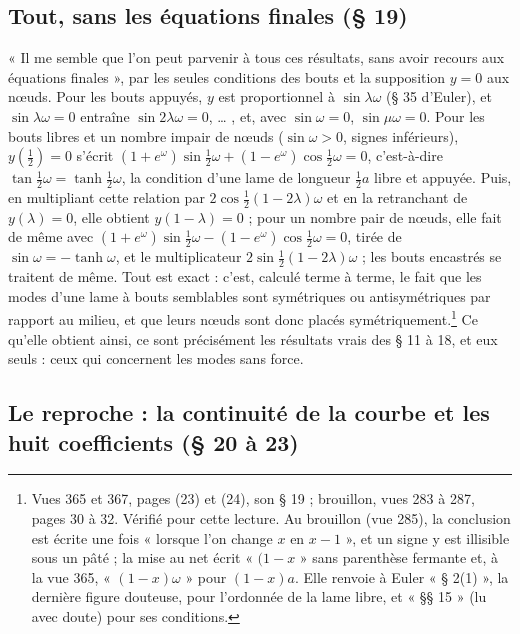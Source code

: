 \documentclass[11pt,a4paper]{article}
\begin{document}
\subsection*{Tout, sans les équations finales (§ 19)}

« Il me semble que l'on peut parvenir à tous ces résultats, sans avoir recours aux équations finales », par les seules conditions des bouts et la supposition $y=0$ aux nœuds. Pour les bouts appuyés, $y$ est proportionnel à $\sin\lambda\omega$ (§ 35 d'Euler), et $\sin\lambda\omega=0$ entraîne $\sin2\lambda\omega=0$, … , et, avec $\sin\omega=0$, $\sin\mu\omega=0$. Pour les bouts libres et un nombre impair de nœuds ($\sin\omega>0$, signes inférieurs), $y(\frac12)=0$ s'écrit $(1+e^{\omega})\sin\frac12\omega+(1-e^{\omega})\cos\frac12\omega=0$, c'est-à-dire $\tan\frac12\omega=\tanh\frac12\omega$, la condition d'une lame de longueur $\frac12a$ libre et appuyée. Puis, en multipliant cette relation par $2\cos\frac12(1-2\lambda)\omega$ et en la retranchant de $y(\lambda)=0$, elle obtient $y(1-\lambda)=0$ ; pour un nombre pair de nœuds, elle fait de même avec $(1+e^{\omega})\sin\frac12\omega-(1-e^{\omega})\cos\frac12\omega=0$, tirée de $\sin\omega=-\tanh\omega$, et le multiplicateur $2\sin\frac12(1-2\lambda)\omega$ ; les bouts encastrés se traitent de même. Tout est exact : c'est, calculé terme à terme, le fait que les modes d'une lame à bouts semblables sont symétriques ou antisymétriques par rapport au milieu, et que leurs nœuds sont donc placés symétriquement.\footnote{Vues 365 et 367, pages (23) et (24), son § 19 ; brouillon, vues 283 à 287, pages 30 à 32. Vérifié pour cette lecture. Au brouillon (vue 285), la conclusion est écrite une fois « lorsque l'on change $x$ en $x-1$ », et un signe y est illisible sous un pâté ; la mise au net écrit « $(1-x$ » sans parenthèse fermante et, à la vue 365, « $(1-x)\omega$ » pour $(1-x)a$. Elle renvoie à Euler « § 2(1) », la dernière figure douteuse, pour l'ordonnée de la lame libre, et « §§ 15 » (lu avec doute) pour ses conditions.} Ce qu'elle obtient ainsi, ce sont précisément les résultats vrais des § 11 à 18, et eux seuls : ceux qui concernent les modes sans force.

\subsection*{Le reproche : la continuité de la courbe et les huit coefficients (§ 20 à 23)}
\end{document}
